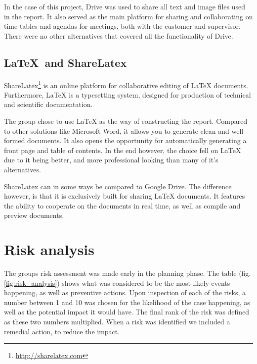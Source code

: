 In the case of this project, Drive was used to share all text and image files used in the report. It also served as the main platform for sharing and collaborating on time-tables and agendas for meetings, both with the customer and supervisor. There were no other alternatives that covered all the functionality of Drive.

\subsection{LaTeX\ and ShareLatex}

ShareLatex\footnote{\url{http://sharelatex.com}} is an online platform for collaborative editing of LaTeX documents. Furthermore, LaTeX is a typesetting system, designed for production of technical and scientific documentation.

The group chose to use LaTeX as the way of constructing the report. Compared to other solutions like Microsoft Word, it allows you to generate clean and well formed documents. It also opens the opportunity for automatically generating a front page and table of contents. In the end however, the choice fell on LaTeX due to it being better, and more professional looking than many of it's alternatives.

ShareLatex can in some ways be compared to Google Drive. The difference however, is that it is exclusively built for sharing LaTeX documents. It features the ability to cooperate on the documents in real time, as well as compile and preview documents.

\section{Risk analysis}

The groups risk assessment was made early in the planning phase. The table (fig. \ref{fig:risk_analysis}) shows what was considered to be the most likely events happening, as well as preventive actions. Upon inspection of each of the risks, a number between 1 and 10 was chosen for the likelihood of the case happening, as well as the potential impact it would have. The final rank of the risk was defined as these two numbers multiplied. When a risk was identified we included a remedial action, to reduce the impact.

